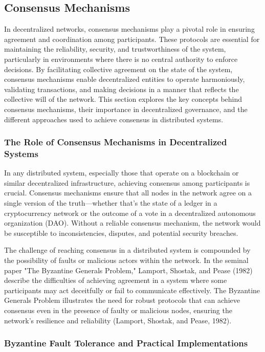 \documentclass[12pt,twoside]{article}
\begin{document}
\subsection{Consensus Mechanisms}

In decentralized networks, consensus mechanisms play a pivotal role in ensuring agreement and coordination among participants. These protocols are essential for maintaining the reliability, security, and trustworthiness of the system, particularly in environments where there is no central authority to enforce decisions. By facilitating collective agreement on the state of the system, consensus mechanisms enable decentralized entities to operate harmoniously, validating transactions, and making decisions in a manner that reflects the collective will of the network. This section explores the key concepts behind consensus mechanisms, their importance in decentralized governance, and the different approaches used to achieve consensus in distributed systems.

\subsubsection{The Role of Consensus Mechanisms in Decentralized Systems}

In any distributed system, especially those that operate on a blockchain or similar decentralized infrastructure, achieving consensus among participants is crucial. Consensus mechanisms ensure that all nodes in the network agree on a single version of the truth—whether that’s the state of a ledger in a cryptocurrency network or the outcome of a vote in a decentralized autonomous organization (DAO). Without a reliable consensus mechanism, the network would be susceptible to inconsistencies, disputes, and potential security breaches.

The challenge of reaching consensus in a distributed system is compounded by the possibility of faults or malicious actors within the network. In the seminal paper "The Byzantine Generals Problem," Lamport, Shostak, and Pease (1982) describe the difficulties of achieving agreement in a system where some participants may act deceitfully or fail to communicate effectively. The Byzantine Generals Problem illustrates the need for robust protocols that can achieve consensus even in the presence of faulty or malicious nodes, ensuring the network’s resilience and reliability (Lamport, Shostak, and Pease, 1982).

\subsubsection{Byzantine Fault Tolerance and Practical Implementations}
\end{document}
